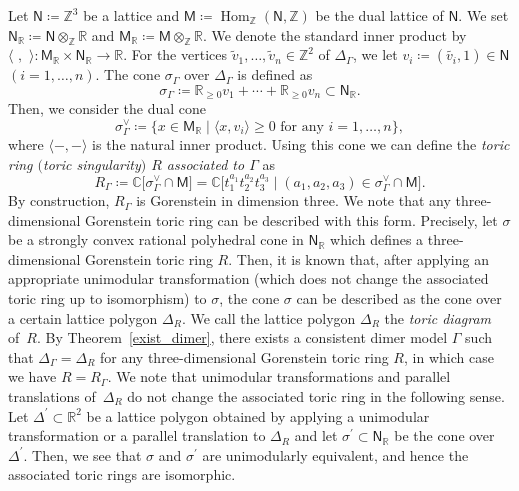 \documentclass[pdftex]{sigma}
\numberwithin{equation}{section}
\theoremstyle{definition}
\newcommand{\ZZ}{\mathbb{Z}}
\newcommand{\RR}{\mathbb{R}}
\newcommand{\CC}{\mathbb{C}}
\newcommand{\sfM}{\mathsf{M}}
\newcommand{\sfN}{\mathsf{N}}
\newcommand{\Hom}{\operatorname{Hom}}
\begin{document}
Let $\sfN\coloneqq \ZZ^3$ be a lattice and $\sfM\coloneqq\Hom_\ZZ(\sfN,\ZZ)$ be the dual lattice of $\sfN$.
We set $\sfN_\RR\coloneqq\sfN\otimes_\ZZ \RR$ and $\sfM_\RR\coloneqq\sfM\otimes_\ZZ \RR$.
We denote the standard inner product by $\langle\,\, , \,\,\rangle\colon \sfM_\RR\times \sfN_\RR\rightarrow \RR$.
For the vertices $\widetilde{v}_1,\dots, \widetilde{v}_n\in\ZZ^2$ of $\Delta_\Gamma$,
we let $v_i\coloneqq (\widetilde{v_i}, 1)\in\sfN$ $(i=1, \dots, n)$. The cone $\sigma_\Gamma$ over $\Delta_\Gamma$ is defined as
\[
\sigma_\Gamma\coloneqq\RR_{\ge0}v_1+\cdots +\RR_{\ge0}v_n \subset\sfN_\RR.
\]
Then, we consider the dual cone
\[
\sigma_\Gamma^\vee\coloneqq\{x\in\sfM_\RR \mid \langle x, v_i\rangle\ge0 \text{ for any } i=1,\dots,n \},
\]
where $\langle - ,- \rangle$ is the natural inner product.
Using this cone we can define the \emph{toric ring $($toric singularity$)$ $R$ associated to $\Gamma$} as
\[
R_\Gamma\coloneqq \CC\bigl[\sigma_\Gamma^\vee\cap\sfM\bigr]=\CC\bigl[t_1^{a_1}t_2^{a_2} t_3^{a_3}\mid (a_1,a_2,a_3)\in\sigma_\Gamma^\vee\cap\sfM\bigr].
\]
By construction, $R_\Gamma$ is Gorenstein in dimension three.
We note that any three-dimensional Gorenstein toric ring can be described with this form.
Precisely,
let $\sigma$ be a strongly convex rational polyhedral cone in $\sfN_\RR$ which defines a three-dimensional Gorenstein toric ring $R$.
Then, it is known that, after applying an appropriate unimodular transformation (which does not change the associated toric ring up to isomorphism) to $\sigma$,
the cone $\sigma$ can be described as the cone over a certain lattice polygon $\Delta_R$.
We call the lattice polygon $\Delta_R$ the \emph{toric diagram} of~$R$.
By Theorem~\ref{exist_dimer}, there exists a consistent dimer model $\Gamma$ such that $\Delta_\Gamma=\Delta_R$ for any three-dimensional Gorenstein toric ring $R$, in which case we have $R=R_\Gamma$.
We note that unimodular transformations and parallel translations of~$\Delta_R$ do not change the associated toric ring in the following sense.
Let $\Delta^\prime\subset\RR^2$ be a lattice polygon obtained by applying a unimodular transformation or a parallel translation to $\Delta_R$
and let $\sigma^\prime\subset\sfN_\RR$ be the cone over $\Delta^\prime$.
Then, we see that $\sigma$ and $\sigma^\prime$ are unimodularly equivalent, and hence the associated toric rings are isomorphic.
\end{document}
